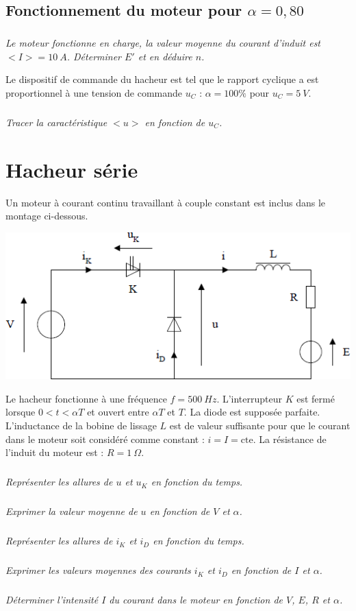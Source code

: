 \documentclass[10pt,fleqn]{article} %
\begin{document}
\begin{multicols}{2}
\begin{multicols}{2}
\subsection*{Fonctionnement du moteur pour $\alpha = 0,80$}
\subparagraph{}\textit{Le moteur fonctionne en charge, la valeur moyenne du courant d'induit est $< I > = \SI{10}{A}$.
Déterminer $E'$ et en déduire $n$.}
\ifprof
\begin{corrige}
\end{corrige}
\else
\fi


Le dispositif de commande du hacheur est tel que le rapport cyclique a est proportionnel à
une tension de commande $u_C$ : $\alpha = 100\%$ pour $u_C =\SI{5}{V}$.

\subparagraph{}\textit{Tracer la caractéristique $< u >$ en fonction de $u_C$.}



\newpage

\section*{Hacheur série}

\setcounter{exo}{0}
Un moteur à courant continu travaillant à couple constant est inclus dans le montage ci-dessous.


\begin{center}
\includegraphics[width=\linewidth]{images/fig_04}
\end{center}


Le hacheur fonctionne à une fréquence $f = \SI{500}{Hz}$.
L’interrupteur $K$ est fermé lorsque $0 < t < \alpha T$ et ouvert entre $\alpha T$ et $T$.
La diode est supposée parfaite.
L'inductance de la bobine de lissage $L$ est de valeur suffisante pour que le courant dans le
moteur soit considéré comme constant : $i= I = \text{cte}$.
La résistance de l’induit du moteur est : $R = \SI{1}{\Omega}$.

\subparagraph{}\textit{ Représenter les allures de $u$ et $u_K$ en fonction du temps.}
\subparagraph{}\textit{ Exprimer la valeur moyenne de $u$ en fonction de $V$ et $\alpha$.}
\subparagraph{}\textit{ Représenter les allures de $i_K$ et $i_D$ en fonction du temps.}
\subparagraph{}\textit{ Exprimer les valeurs moyennes des courants $i_K$ et $i_D$ en fonction de $I$ et $\alpha$.}
\subparagraph{}\textit{ Déterminer l'intensité $I$ du courant dans le moteur en fonction de $V$, $E$, $R$ et $\alpha$.}


\end{multicols}
\end{multicols}
\end{document}
